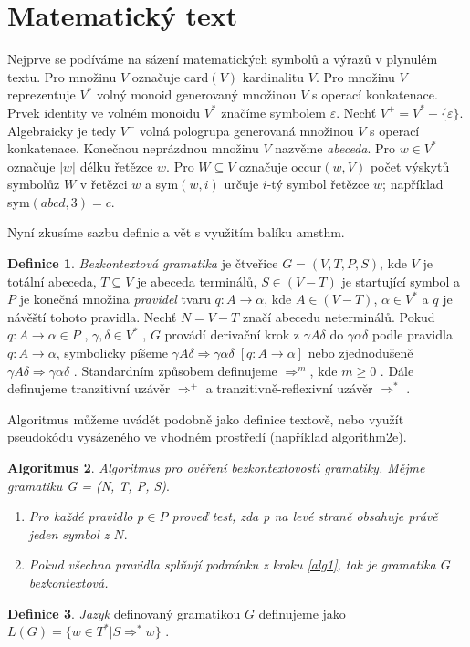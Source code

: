 \documentclass[11pt,twocolumn, a4paper]{article}
\theoremstyle{definition}
\newtheorem{definition}{Definice}[section]
\newtheorem{algorithm}[definition]{Algoritmus}
\begin{document}
\section{Matematický text}
Nejprve se podíváme na sázení matematických symbolů a výrazů v plynulém textu. Pro množinu $V$ označuje card$(V)$ kardinalitu $V$. Pro množinu $V$ reprezentuje $V^*$ volný monoid generovaný množinou $V$ s operací konkatenace. Prvek identity ve volném monoidu $V^*$ značíme symbolem $\varepsilon$. Nechť $V^+=V^*-\{\varepsilon\}$. Algebraicky je tedy $V^+$ volná pologrupa generovaná množinou $V$ s operací konkatenace. Konečnou neprázdnou množinu $V$ nazvěme \textit{abeceda}. Pro $w \in V^*$ označuje $|w|$ délku řetězce $w$. Pro $W \subseteq V$ označuje occur$(w,V)$ počet výskytů symbolů\linebreak z $W$ v řetězci $w$ a sym$(w,i)$ určuje $i$-tý symbol řetězce $w$; například sym$(abcd,3)=c$.\par
%
Nyní zkusíme sazbu definic a vět s využitím balíku {\ttfamily amsthm}.
\par
%
\begin{definition} \textit{Bezkontextová gramatika} je čtveřice $G = (V,T,P,S)$, kde $V$ je totální abeceda, $T \subseteq V$ je abeceda terminálů, $S \in (V - T)$ je startující symbol a $P$ je konečná množina \textit{pravidel} tvaru $q: A \rightarrow \alpha$, kde $A \in (V - T)$, $\alpha \in V^*$ a $q$ je návěští tohoto pravidla. Nechť $N = V - T$ značí abecedu neterminálů. Pokud $q: A \rightarrow \alpha \in P$ , $\gamma,\delta \in V^*$ , $G$ provádí derivační krok z $\gamma A \delta$ do $\gamma\alpha\delta$ podle pravidla $q\!: A \rightarrow \alpha$, symbolicky píšeme $\gamma A \delta \Rightarrow \gamma \alpha \delta\; [q: A \to \alpha]$ nebo zjednodušeně $\gamma A \delta \Rightarrow \gamma\alpha\delta$ . Standardním způsobem definujeme $\Rightarrow^m$, kde $m \geq 0$ . Dále definujeme tranzitivní uzávěr $\Rightarrow^+$ a tranzitivně-reflexivní uzávěr $\Rightarrow^*$ .\end{definition}
%
Algoritmus můžeme uvádět podobně jako definice textově, nebo využít pseudokódu vysázeného ve vhodném prostředí (například {\ttfamily algorithm2e}).\par
%
\begin{algorithm} \textit{Algoritmus pro ověření bezkontextovosti gramatiky. Mějme gramatiku G = (N, T, P, S)}.\end{algorithm}
%
\begin{enumerate}
\label{alg1} \item \textit{Pro každé pravidlo $p \in P$ proveď test, zda p na levé straně obsahuje právě jeden symbol z $N$}.
\item \textit{Pokud všechna pravidla splňují podmínku z kroku \ref{alg1}, tak je gramatika $G$ bezkontextová.}\par
\end{enumerate}
%
\begin{definition} \textit{Jazyk} definovaný gramatikou $G$ definujeme jako $L(G) = \{w \in T^* | S \Rightarrow^* w \}$ . \end{definition}
%
\end{document}
